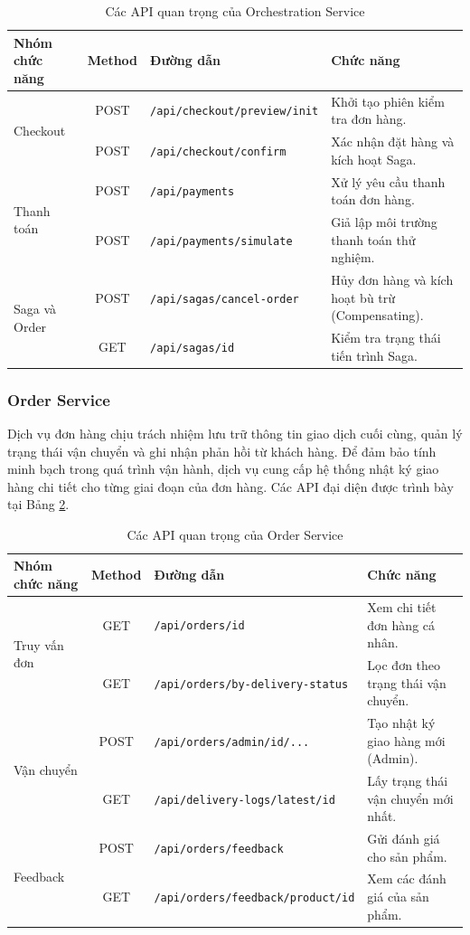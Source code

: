 \begin{table}[H]
\centering
\caption{Các API quan trọng của Orchestration Service}
\label{tab:core_orchestration_api}
\begin{tabular}{|l|c|l|p{4.5cm}|}
\hline
\textbf{Nhóm chức năng} & \textbf{Method} & \textbf{Đường dẫn} & \textbf{Chức năng} \\ \hline
\multirow{2}{*}{Checkout} & POST & \texttt{/api/checkout/preview/init} & Khởi tạo phiên kiểm tra đơn hàng. \\ \cline{2-4}
& POST & \texttt{/api/checkout/confirm} & Xác nhận đặt hàng và kích hoạt Saga. \\ \hline
\multirow{2}{*}{Thanh toán} & POST & \texttt{/api/payments} & Xử lý yêu cầu thanh toán đơn hàng. \\ \cline{2-4}
& POST & \texttt{/api/payments/simulate} & Giả lập môi trường thanh toán thử nghiệm. \\ \hline
\multirow{2}{*}{Saga và Order} & POST & \texttt{/api/sagas/cancel-order} & Hủy đơn hàng và kích hoạt bù trừ (Compensating). \\ \cline{2-4}
& GET & \texttt{/api/sagas/{id}} & Kiểm tra trạng thái tiến trình Saga. \\ \hline
\end{tabular}
\end{table}

\subsubsection{Order Service}

Dịch vụ đơn hàng chịu trách nhiệm lưu trữ thông tin giao dịch cuối cùng, quản lý trạng thái vận chuyển và ghi nhận phản hồi từ khách hàng. Để đảm bảo tính minh bạch trong quá trình vận hành, dịch vụ cung cấp hệ thống nhật ký giao hàng chi tiết cho từng giai đoạn của đơn hàng. Các API đại diện được trình bày tại Bảng \ref{tab:core_order_api}.

\begin{table}[H]
\centering
\caption{Các API quan trọng của Order Service}
\label{tab:core_order_api}
\begin{tabular}{|l|c|l|p{4.5cm}|}
\hline
\textbf{Nhóm chức năng} & \textbf{Method} & \textbf{Đường dẫn} & \textbf{Chức năng} \\ \hline
\multirow{2}{*}{Truy vấn đơn} & GET & \texttt{/api/orders/{id}} & Xem chi tiết đơn hàng cá nhân. \\ \cline{2-4}
& GET & \texttt{/api/orders/by-delivery-status} & Lọc đơn theo trạng thái vận chuyển. \\ \hline
\multirow{2}{*}{Vận chuyển} & POST & \texttt{/api/orders/admin/{id}/...} & Tạo nhật ký giao hàng mới (Admin). \\ \cline{2-4}
& GET & \texttt{/api/delivery-logs/latest/{id}} & Lấy trạng thái vận chuyển mới nhất. \\ \hline
\multirow{2}{*}{Feedback} & POST & \texttt{/api/orders/feedback} & Gửi đánh giá cho sản phẩm. \\ \cline{2-4}
& GET & \texttt{/api/orders/feedback/product/{id}} & Xem các đánh giá của sản phẩm. \\ \hline
\end{tabular}
\end{table}

